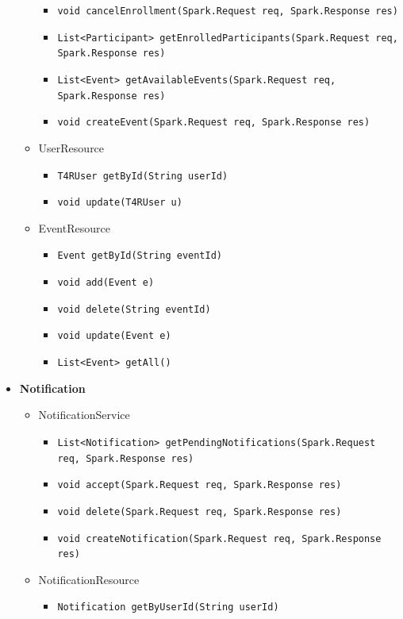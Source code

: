 \documentclass[a4paper, hidelinks, 12pt]{report}
\begin{document}
\begin{itemize}
\begin{itemize}
\begin{itemize}
						\item{\verb|void cancelEnrollment(Spark.Request req, Spark.Response res)|}
						\item{\verb|List<Participant> getEnrolledParticipants(Spark.Request req, Spark.Response res)|}
						\item{\verb|List<Event> getAvailableEvents(Spark.Request req, Spark.Response res)|}
						\item{\verb|void createEvent(Spark.Request req, Spark.Response res)|}
					\end{itemize}
				\item{UserResource}
					\begin{itemize}
						\item{\verb|T4RUser getById(String userId)|}
						\item{\verb|void update(T4RUser u)|}
					\end{itemize}
				\item{EventResource}
					\begin{itemize}
						\item{\verb|Event getById(String eventId)|}
						\item{\verb|void add(Event e)|}
						\item{\verb|void delete(String eventId)|}
						\item{\verb|void update(Event e)|}
						\item{\verb|List<Event> getAll()|}
					\end{itemize}
			\end{itemize}
		\item{\textbf{Notification}}
			\begin{itemize}
				\item{NotificationService}
					\begin{itemize}
						\item{\verb|List<Notification> getPendingNotifications(Spark.Request req, Spark.Response res)|}
						\item{\verb|void accept(Spark.Request req, Spark.Response res)|}
						\item{\verb|void delete(Spark.Request req, Spark.Response res)|}
						\item{\verb|void createNotification(Spark.Request req, Spark.Response res)|}
					\end{itemize}
				\item{NotificationResource}
					\begin{itemize}
						\item{\verb|Notification getByUserId(String userId)|}

\end{itemize}
\end{itemize}
\end{itemize}
\end{document}
